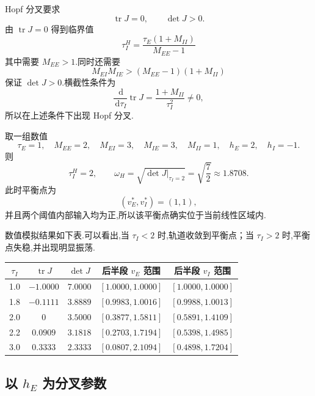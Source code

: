 \documentclass[oneside]{ctexart}
\newcommand{\dd}{\,\mathrm{d}}
\begin{document}
Hopf 分叉要求
\[
    \operatorname{tr}J=0,
    \qquad
    \det J>0.
\]
由 $\operatorname{tr}J=0$ 得到临界值
\begin{equation}
    \boxed{
    \tau_I^H=\dfrac{\tau_E(1+M_{II})}{M_{EE}-1}
    }
\end{equation}
其中需要 $M_{EE}>1$.同时还需要
\begin{equation}
    \boxed{
    M_{EI}M_{IE}>(M_{EE}-1)(1+M_{II})
    }
\end{equation}
保证 $\det J>0$.横截性条件为
\begin{equation}
    \dfrac{\dd}{\dd \tau_I}\operatorname{tr}J
    =\dfrac{1+M_{II}}{\tau_I^2}\neq 0,
\end{equation}
所以在上述条件下出现 Hopf 分叉.

取一组数值
\[
    \tau_E=1,
    \quad M_{EE}=2,
    \quad M_{EI}=3,
    \quad M_{IE}=3,
    \quad M_{II}=1,
    \quad h_E=2,
    \quad h_I=-1.
\]
则
\begin{equation}
    \tau_I^H=2,
    \qquad
    \omega_H=\sqrt{\det J\big|_{\tau_I=2}}
    =\sqrt{\dfrac{7}{2}}\approx 1.8708.
\end{equation}
此时平衡点为
\[
    (v_E^*,v_I^*)=(1,1),
\]
并且两个阈值内部输入均为正,所以该平衡点确实位于当前线性区域内.

数值模拟结果如下表.可以看出,当 $\tau_I<2$ 时,轨道收敛到平衡点；当 $\tau_I>2$ 时,平衡点失稳,并出现明显振荡.

\begin{table}[H]
\centering
\begin{tabular}{ccccc}
\toprule
$\tau_I$ & $\operatorname{tr}J$ & $\det J$ & 后半段 $v_E$ 范围 & 后半段 $v_I$ 范围\\
\midrule
1.0 & $-1.0000$ & $7.0000$ & $[1.0000,1.0000]$ & $[1.0000,1.0000]$\\
1.8 & $-0.1111$ & $3.8889$ & $[0.9983,1.0016]$ & $[0.9988,1.0013]$\\
2.0 & $0$ & $3.5000$ & $[0.3877,1.5811]$ & $[0.5891,1.4109]$\\
2.2 & $0.0909$ & $3.1818$ & $[0.2703,1.7194]$ & $[0.5398,1.4985]$\\
3.0 & $0.3333$ & $2.3333$ & $[0.0807,2.1094]$ & $[0.4898,1.7204]$\\
\bottomrule
\end{tabular}
\end{table}

\subsection*{以 $h_E$ 为分叉参数}
\end{document}
